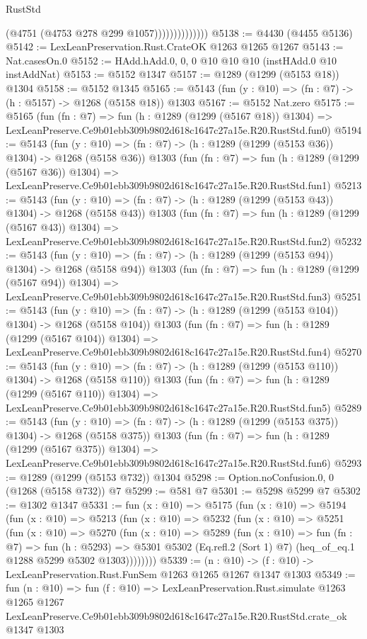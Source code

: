 \begin{lexlean}{RustStd}
\begin{coremodule}
                            (@4751 (@4753 @278 @299 @1057))))))))))))))
@5138 := @4430 (@4455 @5136)
@5142 := LexLeanPreservation.Rust.CrateOK @1263 @1265 @1267
@5143 := Nat.casesOn.{0}
@5152 := HAdd.hAdd.{0, 0, 0} @10 @10 @10 (instHAdd.{0} @10 instAddNat)
@5153 := @5152 @1347
@5157 := @1289 (@1299 (@5153 @18)) @1304
@5158 := @5152 @1345
@5165 := @5143 (fun (y : @10) => (fn : @7) -> (h : @5157) -> @1268 (@5158 @18)) @1303
@5167 := @5152 Nat.zero
@5175 := @5165
    (fun (fn : @7) =>
    fun (h : @1289 (@1299 (@5167 @18)) @1304) =>
    LexLeanPreserve.Ce9b01ebb309b9802d618c1647c27a15e.R20.RustStd.fun0)
@5194 := @5143
    (fun (y : @10) => (fn : @7) -> (h : @1289 (@1299 (@5153 @36)) @1304) -> @1268 (@5158 @36))
    @1303
    (fun (fn : @7) =>
    fun (h : @1289 (@1299 (@5167 @36)) @1304) =>
    LexLeanPreserve.Ce9b01ebb309b9802d618c1647c27a15e.R20.RustStd.fun1)
@5213 := @5143
    (fun (y : @10) => (fn : @7) -> (h : @1289 (@1299 (@5153 @43)) @1304) -> @1268 (@5158 @43))
    @1303
    (fun (fn : @7) =>
    fun (h : @1289 (@1299 (@5167 @43)) @1304) =>
    LexLeanPreserve.Ce9b01ebb309b9802d618c1647c27a15e.R20.RustStd.fun2)
@5232 := @5143
    (fun (y : @10) => (fn : @7) -> (h : @1289 (@1299 (@5153 @94)) @1304) -> @1268 (@5158 @94))
    @1303
    (fun (fn : @7) =>
    fun (h : @1289 (@1299 (@5167 @94)) @1304) =>
    LexLeanPreserve.Ce9b01ebb309b9802d618c1647c27a15e.R20.RustStd.fun3)
@5251 := @5143
    (fun (y : @10) => (fn : @7) -> (h : @1289 (@1299 (@5153 @104)) @1304) -> @1268 (@5158 @104))
    @1303
    (fun (fn : @7) =>
    fun (h : @1289 (@1299 (@5167 @104)) @1304) =>
    LexLeanPreserve.Ce9b01ebb309b9802d618c1647c27a15e.R20.RustStd.fun4)
@5270 := @5143
    (fun (y : @10) => (fn : @7) -> (h : @1289 (@1299 (@5153 @110)) @1304) -> @1268 (@5158 @110))
    @1303
    (fun (fn : @7) =>
    fun (h : @1289 (@1299 (@5167 @110)) @1304) =>
    LexLeanPreserve.Ce9b01ebb309b9802d618c1647c27a15e.R20.RustStd.fun5)
@5289 := @5143
    (fun (y : @10) => (fn : @7) -> (h : @1289 (@1299 (@5153 @375)) @1304) -> @1268 (@5158 @375))
    @1303
    (fun (fn : @7) =>
    fun (h : @1289 (@1299 (@5167 @375)) @1304) =>
    LexLeanPreserve.Ce9b01ebb309b9802d618c1647c27a15e.R20.RustStd.fun6)
@5293 := @1289 (@1299 (@5153 @732)) @1304
@5298 := Option.noConfusion.{0, 0} (@1268 (@5158 @732)) @7
@5299 := @581 @7
@5301 := @5298 @5299 @7
@5302 := @1302 @1347
@5331 := fun (x : @10) =>
  @5175
    (fun (x : @10) =>
    @5194
      (fun (x : @10) =>
      @5213
        (fun (x : @10) =>
        @5232
          (fun (x : @10) =>
          @5251
            (fun (x : @10) =>
            @5270
              (fun (x : @10) =>
              @5289
                (fun (x : @10) =>
                fun (fn : @7) =>
                fun (h : @5293) =>
                @5301 @5302 (Eq.refl.{2} (Sort 1) @7) (heq_of_eq.{1} @1288 @5299 @5302 @1303))))))))
@5339 := (n : @10) -> (f : @10) -> LexLeanPreservation.Rust.FunSem @1263 @1265 @1267 @1347 @1303
@5349 := fun (n : @10) =>
  fun (f : @10) =>
  LexLeanPreservation.Rust.simulate
    @1263
    @1265
    @1267
    LexLeanPreserve.Ce9b01ebb309b9802d618c1647c27a15e.R20.RustStd.crate_ok
    @1347
    @1303
\end{coremodule}
\end{lexlean}
